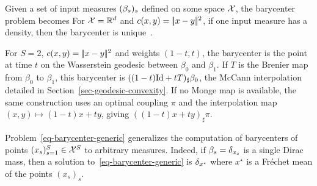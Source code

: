 Given a set of input measures $(\beta_s)_s$ defined on some space $\mathcal{X}$, the barycenter problem becomes
For $\mathcal{X}=\mathbb{R}^d$ and $c(x,y)=|\!| x-y |\!|^2$, if one input measure has a density, then the barycenter is unique~\cite{Carlier_wasserstein_barycenter}.

\begin{example}
	For $S=2$, $c(x,y)=|\!| x-y |\!|^2$ and weights $(1-t,t)$, the barycenter is the point at time $t$ on the Wasserstein geodesic between $\beta_0$ and $\beta_1$. If $T$ is the Brenier map from $\beta_0$ to $\beta_1$, this barycenter is $((1-t)\mathrm{Id}+tT)_\sharp\beta_0$, the McCann interpolation detailed in Section~\ref{sec-geodesic-convexity}. If no Monge map is available, the same construction uses an optimal coupling $\pi$ and the interpolation map $(x,y)\mapsto(1-t)x+ty$, giving $((1-t)x+ty)_\sharp\pi$.
\end{example}
\begin{example}
	Problem~\eqref{eq-barycenter-generic} generalizes the computation of barycenters of points $(x_s)_{s=1}^S \in \mathcal{X}^S$ to arbitrary measures. Indeed, if $\beta_s=\delta_{x_s}$ is a single Dirac mass, then a solution to~\eqref{eq-barycenter-generic} is $\delta_{x^\star}$ where $x^\star$ is a Fr\'echet mean of the points $(x_s)_s$.
\end{example}

